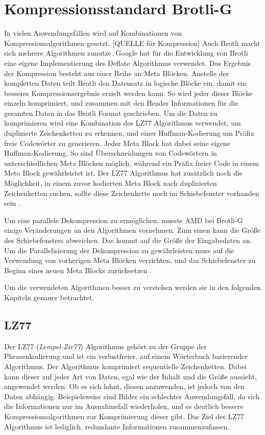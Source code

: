 \section{Kompressionsstandard Brotli-G}
\label{sec:brotlig}
In vielen Anwendungsfällen wird auf Kombinationen von Kompressionsalgorithmen gesetzt.
[QUELLE für Kompression]
Auch Brotli macht sich mehrere Algorithmen zunutze.
Google hat für die Entwicklung von Brotli eine eigene Implementierung des Deflate Algorithmus verwendet.
Das Ergebnis der Kompression besteht aus einer Reihe an Meta Blöcken.
Anstelle der kompletten Daten teilt Brotli den Datensatz in logische Blöcke ein, damit ein besseres Kompressionsergebnis erzielt werden kann.
So wird jeder dieser Blöcke einzeln komprimiert, und zusammen mit den Header Informationen für die gesamten Daten in das Brotli Format geschrieben.
Um die Daten zu komprimieren wird eine Kombination des LZ77 Algorithmus verwendet, um duplizierte Zeichenketten zu erkennen, und einer Huffman-Kodierung um Präfix freie Codewörter zu generieren.
Jeder Meta Block hat dabei seine eigene Huffman-Kodierung.
So sind Überschneidungen von Codewörtern in unterschiedlichen Meta Blöcken möglich, während ein Präfix freier Code in einem Meta Block gewährleistet ist.
Der LZ77 Algorithmus hat zusätzlich noch die Möglichkeit, in einem zuvor kodierten Meta Block nach duplizierten Zeichenketten suchen, sollte diese Zeichenkette noch im Schiebefenster vorhanden sein \cite{rfc7932}. \newline

Um eine parallele Dekompression zu ermöglichen, musste AMD bei Brotli-G einige Veränderungen an den Algorithmen vornehmen.
Zum einen kann die Größe des Schiebefensters abweichen.
Das kommt auf die Größe der Eingabedaten an.
Um die Parallelisierung der Dekompression zu gewährleisten muss auf die Verwendung von vorherigen Meta Blöcken verzichten, und das Schiebefenster zu Beginn eines neuen Meta Blocks zurücksetzen \cite{AMD2024}. \newline

Um die verwendeten Algorithmen besser zu verstehen werden sie in den folgenden Kapiteln genauer betrachtet.

\subsection{LZ77}
\label{subsubsec:lz77}
Der LZ77 (\textit{Lempel-Ziv77}) Algorithmus gehört zu der Gruppe der Phrasenkodierung und ist ein verlustfreier, auf einem Wörterbuch basierender Algorithmus.
Der Algorithmus komprimiert sequentielle Zeichenketten.
Dabei kann dieser auf jeder Art von Daten, egal wie der Inhalt und die Größe aussieht, angewendet werden.
Ob es sich lohnt, diesen anzuwenden, ist jedoch von den Daten abhängig.
Beispielsweise sind Bilder ein schlechter Anwendungsfall, da sich die Informationen nur im Ausnahmefall wiederholen, und es deutlich bessere Kompressionsalgorithmen zur Komprimierung dieser gibt.
Das Ziel des LZ77 Algorithmus ist lediglich, redundante Informationen zusammenzufassen. \newline

